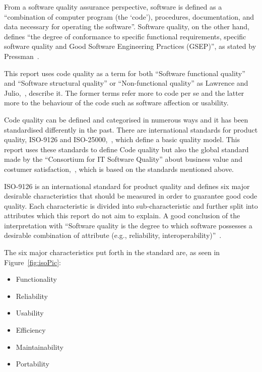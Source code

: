 From a software quality assurance perspective, software is defined  as a ``combination of computer program (the `code'), procedures, documentation, and data necessary for operating the software''\cite{Galin}. Software quality, on the other hand, defines ``the degree of conformance to specific functional requirements, specific software quality and Good Software Engineering Practices (GSEP)'', as stated by Pressman~\cite{Pressman}. 

This report uses code quality as a term for both ``Software functional quality'' and ``Software structural quality'' or ``Non-functional quality'' as Lawrence and Julio,~\cite{Chung}, describe it. The former terms refer more to code per se and the latter more to the behaviour of the code such as software affection or usability. 

Code quality can be defined and categorised in numerous ways and it has been standardised differently in the past. There are international standards for product quality, ISO-9126 and ISO-25000,~\cite{ISO9126}, which define a basic quality model. This report uses these standards to define Code quality but also the global standard made by the ``Consortium for IT Software Quality'' about business value and costumer satisfaction,~\cite{cisq}, which is based on the standards mentioned above. 

ISO-9126 is an international standard for product quality and defines six major desirable characteristics that should be measured in order to guarantee good code quality. Each characteristic is divided into sub-characteristic and further split into attributes which this report do not aim to explain. A good conclusion of the interpretation with 
``Software quality is the degree to which software possesses a desirable combination of attribute (e.g., reliability, interoperability)''~\cite{ISO1061}. 

The six major characteristics put forth in the standard are, as seen in Figure~\ref{fig:isoPic}: 
\begin{itemize}
\item Functionality 
\item Reliability
\item Usability
\item Efficiency
\item Maintainability
\item Portability
\end{itemize}